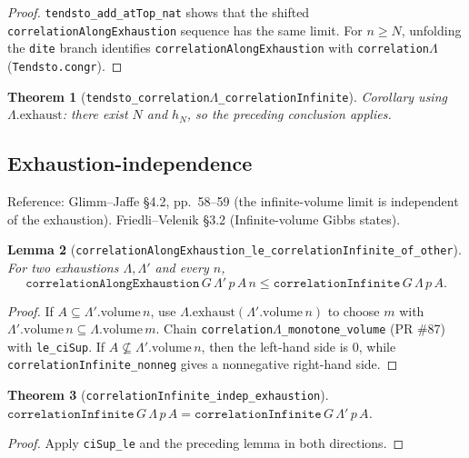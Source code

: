 \documentclass[a4paper,11pt]{article}
\newtheorem{theorem}{Theorem}
\newtheorem{lemma}[theorem]{Lemma}
\newcommand{\LeanLambda}{\texorpdfstring{\ensuremath{\Lambda}}{Lambda}}
\begin{document}
\begin{proof}
\texttt{tendsto\_add\_atTop\_nat} shows that the shifted
\texttt{correlationAlongExhaustion} sequence has the same limit. For
$n \ge N$, unfolding the \texttt{dite} branch identifies
\texttt{correlationAlongExhaustion} with \texttt{correlation\LeanLambda}
(\texttt{Tendsto.congr}).
\end{proof}

\begin{theorem}[\texttt{tendsto\_correlation\LeanLambda\_correlationInfinite}]
Corollary using $\Lambda.\text{exhaust}$: there exist $N$ and $h_N$, so the
preceding conclusion applies.
\end{theorem}

\subsection{Exhaustion-independence}

Reference: Glimm--Jaffe \S 4.2, pp.\ 58--59 (the infinite-volume limit is
independent of the exhaustion). Friedli--Velenik \S 3.2
(Infinite-volume Gibbs states).

\begin{lemma}[\texttt{correlationAlongExhaustion\_le\_correlationInfinite\_of\_other}]
For two exhaustions $\Lambda, \Lambda'$ and every $n$,
\[
\texttt{correlationAlongExhaustion}\,G\,\Lambda'\,p\,A\,n
  \le \texttt{correlationInfinite}\,G\,\Lambda\,p\,A.
\]
\end{lemma}

\begin{proof}
If $A \subseteq \Lambda'.\text{volume}\,n$, use
$\Lambda.\text{exhaust}(\Lambda'.\text{volume}\,n)$ to choose $m$ with
$\Lambda'.\text{volume}\,n \subseteq \Lambda.\text{volume}\,m$. Chain
\texttt{correlation\LeanLambda\_monotone\_volume} (PR \#87) with \texttt{le\_ciSup}.
If $A \not\subseteq \Lambda'.\text{volume}\,n$, then the left-hand side is
0, while \texttt{correlationInfinite\_nonneg} gives a nonnegative
right-hand side.
\end{proof}

\begin{theorem}[\texttt{correlationInfinite\_indep\_exhaustion}]
$\texttt{correlationInfinite}\,G\,\Lambda\,p\,A
  = \texttt{correlationInfinite}\,G\,\Lambda'\,p\,A$.
\end{theorem}

\begin{proof}
Apply \texttt{ciSup\_le} and the preceding lemma in both directions.
\end{proof}
\end{document}
